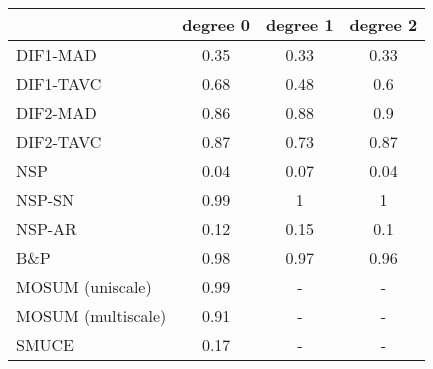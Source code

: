 \begin{tabular}{|l|c|c|c|}
  \hline
 & degree 0 & degree 1 & degree 2 \\ 
  \hline
DIF1-MAD & 0.35 & 0.33 & 0.33 \\ 
  DIF1-TAVC & 0.68 & 0.48 & 0.6 \\ 
  DIF2-MAD & 0.86 & 0.88 & 0.9 \\ 
  DIF2-TAVC & 0.87 & 0.73 & 0.87 \\ 
  NSP & 0.04 & 0.07 & 0.04 \\ 
  NSP-SN & 0.99 & 1 & 1 \\ 
  NSP-AR & 0.12 & 0.15 & 0.1 \\ 
  B\&P & 0.98 & 0.97 & 0.96 \\ 
  MOSUM (uniscale) & 0.99 & - & - \\ 
  MOSUM (multiscale) & 0.91 & - & - \\ 
  SMUCE & 0.17 & - & - \\ 
   \hline
\end{tabular}
